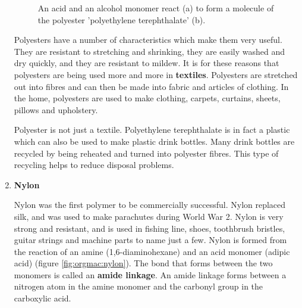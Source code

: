 \begin{enumerate}
{\begin{figure}[h]
\begin{center}
\caption{An acid and an alcohol monomer react (a) to form a molecule of the polyester 'polyethylene terephthalate' (b).}
\label{fig:orgmac:polyester2}
\end{center}
\end{figure}
}

Polyesters have a number of characteristics which make them very useful. They are resistant to stretching and shrinking, they are easily washed and dry quickly, and they are resistant to mildew. It is for these reasons that polyesters are being used more and more in \textbf{textiles}. Polyesters are stretched out into fibres and can then be made into fabric and articles of clothing. In the home, polyesters are used to make clothing, carpets, curtains, sheets, pillows and upholstery. 

\begin{IFact}{
Polyester is not just a textile. Polyethylene terephthalate is in fact a plastic which can also be used to make plastic drink bottles. Many drink bottles are recycled by being reheated and turned into polyester fibres. This type of recycling helps to reduce disposal problems.}
\end{IFact}

\item{\textbf{Nylon}

Nylon was the first polymer to be commercially successful. Nylon replaced silk, and was used to make parachutes during World War 2. Nylon is very strong and resistant, and is used in fishing line, shoes, toothbrush bristles, guitar strings and machine parts to name just a few. Nylon is formed from the reaction of an amine (1,6-diaminohexane) and an acid monomer (adipic acid) (figure \ref{fig:orgmac:nylon}). The bond that forms between the two monomers is called an \textbf{amide linkage}. An amide linkage forms between a nitrogen atom in the amine monomer and the carbonyl group in the carboxylic acid.

}
\end{enumerate}
